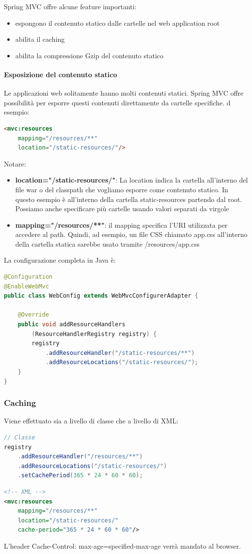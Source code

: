 \documentclass[11pt,a4paper]{book}
\begin{document}
Spring MVC offre alcune feature importanti:
\begin{itemize}
	\item espongono il contenuto statico dalle cartelle nel web application root
	\item abilita il caching
	\item abilita la compressione Gzip del contenuto statico
\end{itemize}

\paragraph{Esposizione del contenuto statico}
Le applicazioni web solitamente hanno molti contenuti statici. Spring MVC offre possibilità per esporre questi contenuti direttamente da cartelle specifiche. d esempio:
\begin{lstlisting}[language = HTML]
<mvc:resources
	mapping="/resources/**"
	location="/static-resources/"/>
\end{lstlisting}

Notare:
\begin{itemize}
	\item \textbf{location="/static-resources/"}: La location indica la cartella all'interno del file war o del classpath che vogliamo esporre come contenuto statico. In questo esempio è all'interno della cartella static-resources partendo dal root. Possiamo anche specificare più cartelle usando valori separati da virgole
	\item \textbf{mapping="/resources/**"}: il mapping specifica l'URI utilizzata per accedere al path. Quindi, ad esempio, un file CSS chiamato app.css all'interno della cartella statica sarebbe usato tramite /resources/app.css
\end{itemize}

La configurazione completa in Java è:
\begin{lstlisting}[language = Java]
@Configuration
@EnableWebMvc
public class WebConfig extends WebMvcConfigurerAdapter {
	
	@Override
	public void addResourceHandlers
		(ResourceHandlerRegistry registry) {
		registry
			.addResourceHandler("/static-resources/**")
			.addResourceLocations("/static-resources/");
	}
}
\end{lstlisting}

\subsubsection{Caching}
Viene effettuato sia a livello di classe che a livello di XML:
\begin{lstlisting}[language = Java]
// Classe
registry
	.addResourceHandler("/resources/**")
	.addResourceLocations("/static-resources/")
	.setCachePeriod(365 * 24 * 60 * 60);
\end{lstlisting}
\begin{lstlisting}[language = XML]
<!-- XML -->
<mvc:resources
	mapping="/resources/**"
	location="/static-resources/"
	cache-period="365 * 24 * 60 * 60"/>
\end{lstlisting}
L'header Cache-Control: max-age={specified-max-age} verrà mandato al browser.
\end{document}
